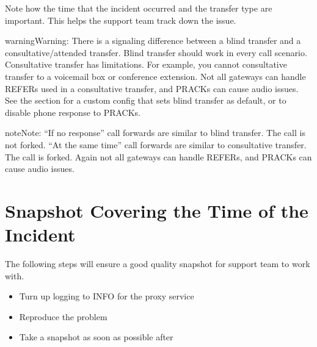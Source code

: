 \documentclass[letterpaper,10pt,english]{sphinxmanual}
\begin{document}

Note how the time that the incident occurred and the transfer type are important. This helps the support team track down the issue.

\begin{sphinxadmonition}{warning}{Warning:}
There is a signaling difference between a blind transfer and a consultative/attended transfer.
Blind transfer should work in every call scenario. Consultative transfer has limitations. For example, you cannot consultative transfer to a voicemail box or conference extension.
 Not all gateways can handle REFERs used in a consultative transfer, and PRACKs can cause audio issues.
See the {\hyperref[\detokenize{webui:example-custom-configuration-files}]{}} section for a custom config that sets blind transfer as default, or to disable phone response to PRACKs.
\end{sphinxadmonition}

\begin{sphinxadmonition}{note}{Note:}
“If no response” call forwards are similar to blind transfer. The call is not forked.
“At the same time” call forwards are similar to consultative transfer. The call is forked.
Again not all gateways can handle REFERs, and PRACKs can cause audio issues.
\end{sphinxadmonition}


\section{Snapshot Covering the Time of the Incident}
\label{\detokenize{troubleshooting:snapshot-covering-the-time-of-the-incident}}
The following steps will ensure a good quality snapshot for support team to work with.
\begin{itemize}
\item {} 
Turn up logging to INFO for the proxy service

\item {} 
Reproduce the problem

\item {} 
Take a snapshot as soon as possible after

\end{itemize}
\end{document}
